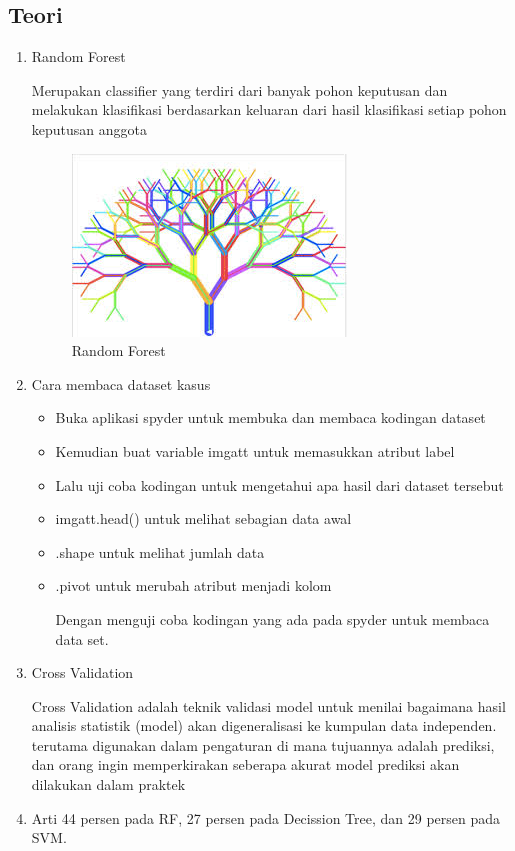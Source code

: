 \subsection {Teori}
\begin{enumerate}
\item Random Forest
\par
Merupakan classifier yang terdiri dari banyak pohon keputusan dan melakukan klasifikasi berdasarkan keluaran dari hasil klasifikasi setiap pohon keputusan anggota
\begin{figure}[ht]
\centering
\includegraphics[scale=0.5]{figures/111.JPG}
\caption{Random Forest}
\end{figure}
\item Cara membaca dataset kasus
\begin{itemize}
\item Buka aplikasi spyder untuk membuka dan membaca kodingan dataset
\item Kemudian buat  variable imgatt untuk memasukkan atribut label
\item Lalu uji coba kodingan untuk mengetahui apa hasil dari dataset tersebut
\item imgatt.head() untuk melihat sebagian data awal
\item .shape untuk melihat jumlah data
\item .pivot untuk merubah atribut menjadi kolom
\par
Dengan menguji coba kodingan yang ada pada spyder untuk membaca data set.
\end{itemize}
\item Cross Validation
\par 
Cross Validation adalah teknik validasi model untuk menilai bagaimana hasil analisis statistik (model) akan digeneralisasi ke kumpulan data independen. terutama digunakan dalam pengaturan di mana tujuannya adalah prediksi, dan orang ingin memperkirakan seberapa akurat model prediksi akan dilakukan dalam praktek
\item Arti 44 persen pada RF, 27 persen pada Decission Tree, dan 29 persen pada SVM.

\end{enumerate}
